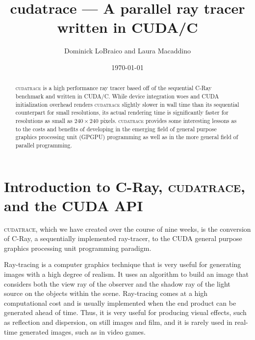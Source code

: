 \documentclass[12pt]{article}
\begin{document}
\lstset{language=C,breaklines=true}

\title{cudatrace --- A parallel ray tracer written in CUDA/C}
\author{Dominick LoBraico and Laura Macaddino}
\date{\today}
\maketitle

\begin{abstract}
    \textsc{cudatrace} is a high performance ray tracer based off of the sequential C-Ray benchmark and written in CUDA/C. While device integration woes and CUDA initialization overhead renders \textsc{cudatrace} slightly slower in wall time than its sequential counterpart for small resolutions, its actual rendering time is significantly faster for resolutions as small as $240 \times 240$ pixels. \textsc{cudatrace} provides some interesting lessons as to the costs and benefits of developing in the emerging field of general purpose graphics processing unit (GPGPU) programming as well as in the more general field of parallel programming.
\end{abstract}

\pagebreak
\tableofcontents
\listoffigures
\listoftables
\pagebreak


\section[Introduction]{Introduction to C-Ray, \textsc{cudatrace}, and the CUDA API}
\textsc{cudatrace}, which we have created over the course of nine weeks, is the conversion of C-Ray, a sequentially implemented ray-tracer, to the CUDA general purpose graphics processing unit programming paradigm.

Ray-tracing is a computer graphics technique that is very useful for generating images with a high degree of realism. It uses an algorithm to build an image that considers both the view ray of the observer and the shadow ray of the light source on the objects within the scene. Ray-tracing comes at a high computational cost and is usually implemented when the end product can be generated ahead of time. Thus, it is very useful for producing visual effects, such as reflection and dispersion, on still images and film, and it is rarely used in real-time generated images, such as in video games.
\end{document}
